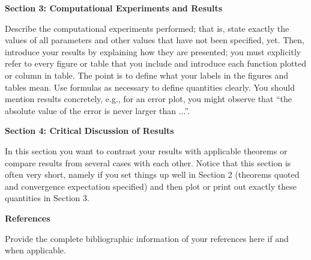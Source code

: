 \documentclass[11pt]{article}
\begin{document}
{\bf Section 3: Computational Experiments and Results}

\vspace{0.1cm} Describe the computational experiments performed; that
is, state exactly the values of all parameters and other values that
have not been specified, yet. Then, introduce
your results by explaining how they are presented; you must explicitly
refer to every figure or table that you include and introduce each
function plotted or column in table. The point is to define what your
labels in the figures and tables mean. Use formulas as necessary to
define quantities clearly. You should mention results concretely,
e.g., for an error plot, you might observe that ``the absolute value of
the error is never larger than ...''.

{\bf Section 4: Critical Discussion of Results}

\vspace{0.1cm} In this section you want to contrast your results with
applicable theorems or compare results from several cases with each
other. Notice that this section is often very short, namely if you set
things up well in Section 2 (theorems quoted and convergence
expectation specified) and then plot or print out exactly these
quantities in Section 3.

{\bf References}

\vspace{0.1cm} Provide the complete bibliographic information of
your references here if and when applicable.
\end{document}
